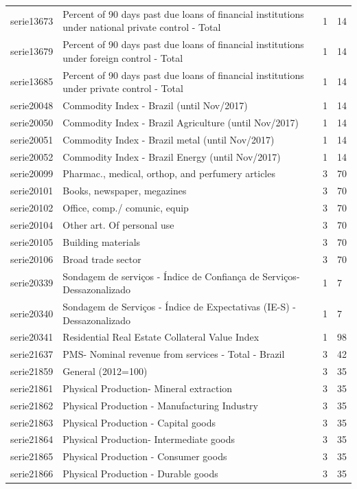\documentclass{article}
\begin{document}
\begin{landscape}
\begin{center}
\begin{longtable}{|l|l|l|l|}
serie13673 & Percent of 90 days past due loans of financial institutions under national private control - Total & 1 & 14 \\
serie13679 & Percent of 90 days past due loans of financial institutions under foreign control - Total & 1 & 14 \\
serie13685 & Percent of 90 days past due loans of financial institutions under private control - Total & 1 & 14 \\
serie20048 & Commodity Index - Brazil (until Nov/2017) & 1 & 14 \\
serie20050 & Commodity Index - Brazil Agriculture (until Nov/2017) & 1 & 14 \\
serie20051 & Commodity Index - Brazil metal (until Nov/2017) & 1 & 14 \\
serie20052 & Commodity Index - Brazil Energy (until Nov/2017) & 1 & 14 \\
serie20099 & Pharmac., medical, orthop, and perfumery articles & 3 & 70 \\
serie20101 & Books, newspaper, megazines & 3 & 70 \\
serie20102 & Office, comp./ comunic, equip & 3 & 70 \\
serie20104 & Other art. Of personal use & 3 & 70 \\
serie20105 & Building materials & 3 & 70 \\
serie20106 & Broad trade sector & 3 & 70 \\
serie20339 & Sondagem de serviços - Índice de Confiança de Serviços- Dessazonalizado & 1 & 7 \\
serie20340 & Sondagem de Serviços - Índice de Expectativas (IE-S) - Dessazonalizado & 1 & 7 \\
serie20341 & Residential Real Estate Collateral Value Index & 1 & 98 \\
serie21637 & PMS- Nominal revenue from services - Total - Brazil & 3 & 42 \\
serie21859 & General (2012=100) & 3 & 35 \\
serie21861 & Physical Production- Mineral extraction & 3 & 35 \\
serie21862 & Physical Production - Manufacturing Industry & 3 & 35 \\
serie21863 & Physical Production - Capital goods & 3 & 35 \\
serie21864 & Physical Production- Intermediate goods & 3 & 35 \\
serie21865 & Physical Production - Consumer goods & 3 & 35 \\
serie21866 & Physical Production - Durable goods & 3 & 35 \\

\end{longtable}
\end{center}
\end{landscape}
\end{document}
